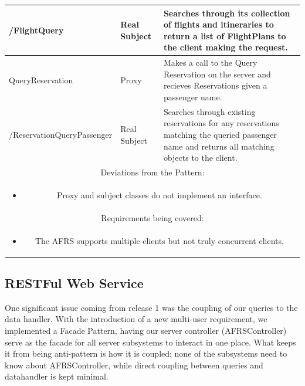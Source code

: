 \begin{center}
\begin{tabular}{ |p{4cm}|p{4cm}|p{7cm}|  }
        \\
        \hline
        /FlightQuery & Real Subject &
        Searches through its collection of flights and itineraries to return a list of FlightPlans to the client making the request.
        \\
        \hline
        QueryReservation & Proxy &
        Makes a call to the Query Reservation on the server and recieves Reservations given a passenger name.
        \\
        \hline
        /ReservationQueryPassenger & Real Subject &
        Searches through existing reservations for any reservations matching the queried passenger name and returns all matching objects to the client.
        \\
        \hline

        \hline
        \multicolumn{3}{|c|}{Deviations from the Pattern:} \\ \multicolumn{3}{|c|}{\parbox{0.9\textwidth}{
        \begin{itemize}
            \item Proxy and subject classes do not implement an interface.
        \end{itemize} }} \\
        \hline
        \multicolumn{3}{|c|}{Requirements being covered:} \\ \multicolumn{3}{|c|}{\parbox{0.9\textwidth}{
        \begin{itemize}
            \item The AFRS supports multiple clients but not truly concurrent clients.
        \end{itemize} }} \\
        \hline
    \end{tabular}
\end{center}

\newpage

\subsection{RESTFul Web Service}\label{subsec:restfulWebService2}

One significant issue coming from release 1 was the coupling of our queries to the data handler.
With the introduction of a new multi-user requirement, we implemented a Facade Pattern, having our server controller (AFRSController) serve as the facade for all server subsystems to interact in one place.
What keeps it from being anti-pattern is how it is coupled;
none of the subsystems need to know about AFRSController, while direct coupling between queries and datahandler is kept minimal.

